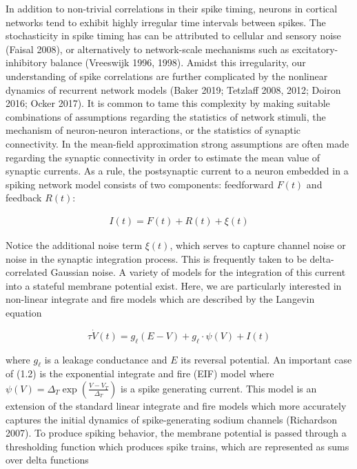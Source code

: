 \documentclass{ucetd}
\begin{document}
In addition to non-trivial correlations in their spike timing, neurons in cortical networks tend to exhibit highly irregular time intervals between spikes. The stochasticity in spike timing has can be attributed to cellular and sensory noise (Faisal 2008), or alternatively to network-scale mechanisms such as excitatory-inhibitory balance (Vreeswijk 1996, 1998). Amidst this irregularity, our understanding of spike correlations are further complicated by the nonlinear dynamics of recurrent network models (Baker 2019; Tetzlaff 2008, 2012; Doiron 2016; Ocker 2017). It is common to tame this complexity by making suitable combinations of assumptions regarding the statistics of network stimuli, the mechanism of neuron-neuron interactions, or the statistics of synaptic connectivity. In the mean-field approximation strong assumptions are often made regarding the synaptic connectivity in order to estimate the mean value of synaptic currents. As a rule, the postsynaptic current to a neuron embedded in a spiking network model consists of two components: feedforward $F(t)$ and feedback $R(t)$:

\begin{align}
I(t) = F(t) + R(t) + \xi(t)
\end{align}

Notice the additional noise term $\xi(t)$, which serves to capture channel noise or noise in the synaptic integration process. This is frequently taken to be delta-correlated Gaussian noise. A variety of models for the integration of this current into a stateful membrane potential exist. Here, we are particularly interested in non-linear integrate and fire models which are described by the Langevin equation

\begin{equation}
\tau\dot{V}(t) = g_{\ell}(E - V) + g_{\ell}\cdot \psi(V) + I(t)
\end{equation}

where $g_{\ell}$ is a leakage conductance and $E$ its reversal potential. An important case of (1.2) is the exponential integrate and fire (EIF) model where $\psi(V) = \Delta_{T}\exp\left(\frac{V-V_{T}}{\Delta_{T}}\right)$ is a spike generating current. This model is an extension of the standard linear integrate and fire models which more accurately captures the initial dynamics of spike-generating sodium channels (Richardson 2007). To produce spiking behavior, the membrane potential is passed through a thresholding function which produces spike trains, which are represented as sums over delta functions
\end{document}
